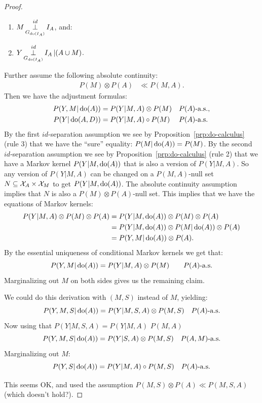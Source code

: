 \begin{proof}
\begin{enumerate}
    \item $\displaystyle M \operatorname*{\perp}^{id}_{G_{\operatorname{do}(I_A)}} I_A$, and:
    \item $\displaystyle Y \operatorname*{\perp}^{id}_{G_{\operatorname{do}(I_A)}} I_A  \operatorname*{|} (A \cup M)$.
\end{enumerate}
Further assume the following absolute continuity:
  \begin{align*}
      P(M) \otimes P(A) &\ll  P(M,A).
  \end{align*}
Then we have the adjustment formulas: 
\begin{align*}
    P(Y,M|\operatorname{do}(A)) &= P(Y|M,A) \otimes P(M) && P(A)\text{-a.s.}, \\
    P(Y|\operatorname{do}(A,D)) &= P(Y|M,A) \circ P(M) && P(A)\text{-a.s.}
\end{align*}
By the first $id$-separation assumption we see by Proposition~\ref{prp:do-calculus} (rule 3) that we have the ``sure'' equality: $P(M|\operatorname{do}(A)) = P(M)$.
By the second $id$-separation assumption we see by Proposition~\ref{prp:do-calculus} (rule 2) that we have a Markov kernel $P(Y|M,\operatorname{do}(A))$ that is also a version of $P(Y|M,A)$.
So any version of $P(Y|M,A)$ can be changed on a $P(M,A)$-null set $N \subseteq \mathcal{X}_A \times \mathcal{X}_M$ to get $P(Y|M,\operatorname{do}(A))$.
The absolute continuity assumption implies that $N$ is also a $P(M) \otimes P(A)$-null set.
This implies that we have the equations of Markov kernels:
\begin{align*}
  P(Y|M,A) \otimes P(M) \otimes P(A) 
  &= P(Y|M,\operatorname{do}(A)) \otimes P(M) \otimes P(A) \\
  &= P(Y|M,\operatorname{do}(A)) \otimes P(M|\operatorname{do}(A)) \otimes P(A) \\
  &= P(Y,M|\operatorname{do}(A)) \otimes P(A).
\end{align*}
By the essential uniqueness of conditional Markov kernels we get that:
\[ P(Y,M|\operatorname{do}(A)) = P(Y|M,A) \otimes P(M)  \qquad P(A)\text{-a.s.} \]
Marginalizing out $M$ on both sides gives us the remaining claim.

We could do this derivation with $(M,S)$ instead of $M$, yielding:
$$P(Y,M,S|\operatorname{do}(A)) = P(Y|M,S,A) \otimes P(M,S) \quad P(A)\text{-a.s.}$$
Now using that $P(Y|M,S,A) = P(Y|M,A)$ $P(M,A)$
$$P(Y,M,S|\operatorname{do}(A)) = P(Y|S,A) \otimes P(M,S) \quad P(A,M)\text{-a.s.}$$
Marginalizing out $M$:
$$P(Y,S|\operatorname{do}(A)) = P(Y|M,A) \circ P(M,S) \quad P(A)\text{-a.s.}$$

This seems OK, and used the assumption $P(M,S) \otimes P(A) \ll P(M,S,A)$ (which doesn't hold?).


\end{proof}

